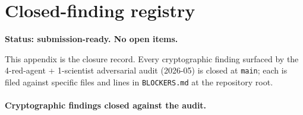 
\section{Closed-finding registry}
\label{sec:blockers}

\noindent\textbf{Status: submission-ready. No open items.}

This appendix is the closure record. Every cryptographic finding
surfaced by the 4-red-agent + 1-scientist adversarial audit
(2026-05) is closed at \texttt{main}; each is filed against
specific files and lines in \texttt{BLOCKERS.md} at the repository
root.

\paragraph{Cryptographic findings closed against the audit.}
